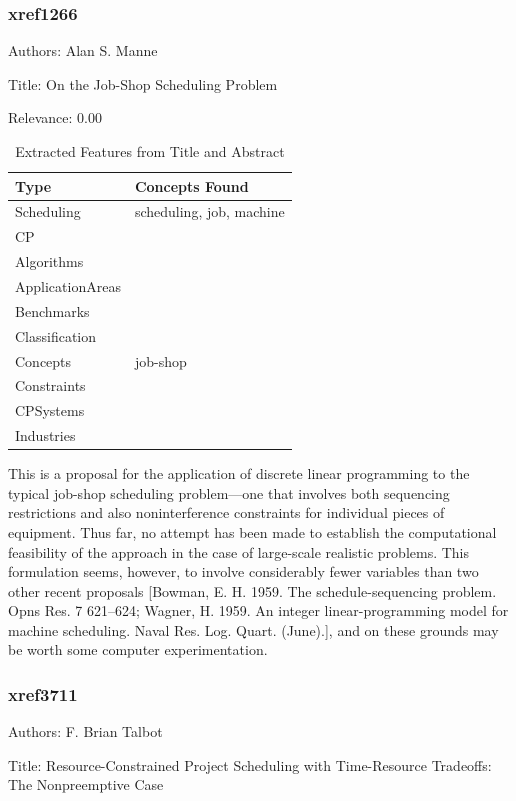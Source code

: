 \subsubsection{xref1266}
\label{mw:xref1266}

Authors: Alan S. Manne

Title: On the Job-Shop Scheduling Problem

Relevance:  0.00

{\scriptsize
\begin{longtable}{p{2cm}p{20cm}}
\caption{Extracted Features from Title and Abstract}\\ \toprule
Type & Concepts Found\\ \midrule
\endhead
\bottomrule
\endfoot
Scheduling & scheduling, job, machine\\ 
CP & \\ 
Algorithms & \\ 
ApplicationAreas & \\ 
Benchmarks & \\ 
Classification & \\ 
Concepts & job-shop\\ 
Constraints & \\ 
CPSystems & \\ 
Industries & \\ 
\end{longtable}
}

  This is a proposal for the application of discrete linear programming to the typical job-shop scheduling problem—one that involves both sequencing restrictions and also noninterference constraints for individual pieces of equipment. Thus far, no attempt has been made to establish the computational feasibility of the approach in the case of large-scale realistic problems. This formulation seems, however, to involve considerably fewer variables than two other recent proposals [Bowman, E. H. 1959. The schedule-sequencing problem. Opns Res. 7 621–624; Wagner, H. 1959. An integer linear-programming model for machine scheduling. Naval Res. Log. Quart. (June).], and on these grounds may be worth some computer experimentation.  

\subsubsection{xref3711}
\label{mw:xref3711}

Authors: F. Brian Talbot

Title: Resource-Constrained Project Scheduling with Time-Resource Tradeoffs: The Nonpreemptive Case

